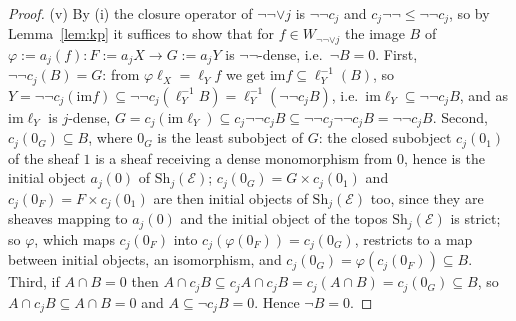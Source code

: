 \documentclass[11pt]{amsart}
\theoremstyle{definition}
\newcommand{\im}{\mathrm{im}}
\newcommand{\Sh}{\mathrm{Sh}}
\newcommand{\cE}{\mathcal E}
\begin{document}
\begin{proof}
(v) By (i) the closure operator of $\neg\neg\vee j$ is $\neg\neg c_j$ and
$c_j\neg\neg\le\neg\neg c_j$, so by Lemma~\ref{lem:kp} it suffices to show
that for $f\in W_{\neg\neg\vee j}$ the image $B$ of $\varphi:=a_j(f)\colon
F:=a_jX\to G:=a_jY$ is $\neg\neg$-dense, i.e.\ $\neg B=0$. First,
$\neg\neg c_j(B)=G$: from $\varphi\ell_X=\ell_Yf$ we get $\im f\subseteq
\ell_Y^{-1}(B)$, so $Y=\neg\neg c_j(\im f)\subseteq\neg\neg c_j(\ell_Y^{-1}
B)=\ell_Y^{-1}(\neg\neg c_jB)$, i.e.\ $\im\ell_Y\subseteq\neg\neg c_jB$,
and as $\im\ell_Y$ is $j$-dense, $G=c_j(\im\ell_Y)\subseteq c_j\neg\neg c_j
B\subseteq\neg\neg c_j\neg\neg c_jB=\neg\neg c_jB$. Second, $c_j(0_G)
\subseteq B$, where $0_G$ is the least subobject of $G$: the closed
subobject $c_j(0_1)$ of the sheaf $1$ is a sheaf receiving a dense
monomorphism from $0$, hence is the initial object $a_j(0)$ of
$\Sh_j(\cE)$; $c_j(0_G)=G\times c_j(0_1)$ and $c_j(0_F)=F\times c_j(0_1)$
are then initial objects of $\Sh_j(\cE)$ too, since they are sheaves
mapping to $a_j(0)$ and the initial object of the topos $\Sh_j(\cE)$ is
strict; so $\varphi$, which maps $c_j(0_F)$ into
$c_j(\varphi(0_F))=c_j(0_G)$, restricts to a map between initial objects,
an isomorphism, and $c_j(0_G)=\varphi(c_j(0_F))\subseteq B$. Third, if
$A\cap B=0$ then $A\cap c_jB\subseteq c_jA\cap c_jB=c_j(A\cap B)=c_j(0_G)
\subseteq B$, so $A\cap c_jB\subseteq A\cap B=0$ and $A\subseteq\neg c_jB=
0$. Hence $\neg B=0$.
\end{proof}
\end{document}
